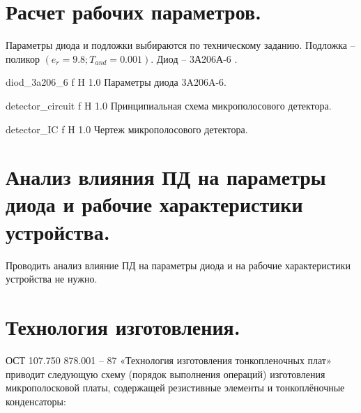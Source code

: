 \documentclass{bmstu}
\begin{document}
	\chapter{Расчет рабочих параметров.}
	
	\indent	Параметры диода и подложки выбираются по техническому заданию. Подложка – 
	поликор $(e_r = 9.8; T_{and} = 0.001)$. Диод – 3А206А-6 \cite{9}.
	
	{diod_3a206_6}
	{f} %
	{H} %
	{1.0\textwidth} %
	{Параметры диода 3A206A-6.} %
	
	{detector_circuit}
	{f} %
	{H} %
	{1.0\textwidth} %
	{Принципиальная схема микрополосового детектора.} %
	
	{detector_IC}
	{f} %
	{H} %
	{1.0\textwidth} %
	{Чертеж микрополосового детектора.} %
	
	\chapter{Анализ влияния ПД на параметры диода и рабочие характеристики устройства.}
	
	Проводить анализ влияние ПД на параметры диода и на рабочие характеристики устройства не нужно.
	
	\chapter{Технология изготовления.} 
	
	ОСТ 107.750 878.001 – 87   «Технология изготовления тонкопленочных плат» приводит следующую схему (порядок выполнения операций)  изготовления микрополосковой платы, содержащей резистивные элементы и тонкоплёночные конденсаторы:
	
\end{document}
